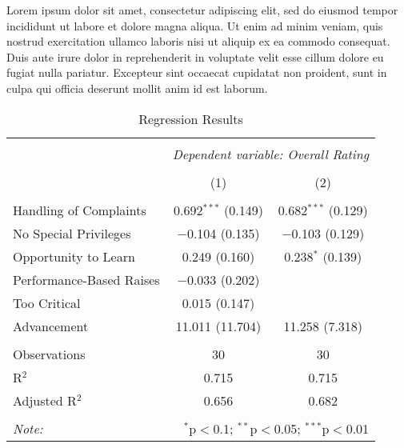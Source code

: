 \documentclass[11pt]{article}
\begin{document}
Lorem ipsum dolor sit amet, consectetur adipiscing elit, sed do eiusmod tempor incididunt ut labore et dolore magna aliqua. Ut enim ad minim veniam, quis nostrud exercitation ullamco laboris nisi ut aliquip ex ea commodo consequat. Duis aute irure dolor in reprehenderit in voluptate velit esse cillum dolore eu fugiat nulla pariatur. Excepteur sint occaecat cupidatat non proident, sunt in culpa qui officia deserunt mollit anim id est laborum. 



\begin{table}[tb] \centering 
    \caption{Regression Results} 
    \label{reg1}
    
    \begin{tabular}{@{\extracolsep{5pt}}lcc} 
    \hline 
    \hline \\[-1.8ex] 
    & \multicolumn{2}{c}{\textit{Dependent variable: Overall Rating}} \\ 
    \cline{2-3} 
    \\[-1.8ex] & (1) & (2)\\ 
    \hline \\[-1.8ex] 
    Handling of Complaints & 0.692$^{***}$ (0.149) & 0.682$^{***}$ (0.129) \\ 
    No Special Privileges & $-$0.104 (0.135) & $-$0.103 (0.129) \\ 
    Opportunity to Learn & 0.249 (0.160) & 0.238$^{*}$ (0.139) \\ 
    Performance-Based Raises & $-$0.033 (0.202) &  \\ 
    Too Critical & 0.015 (0.147) &  \\ 
    Advancement & 11.011 (11.704) & 11.258 (7.318) \\ 
    \hline \\[-1.8ex] 
    Observations & 30 & 30 \\ 
    R$^{2}$ & 0.715 & 0.715 \\ 
    Adjusted R$^{2}$ & 0.656 & 0.682 \\ 
    \hline 
    \hline \\[-1.8ex] 
    \textit{Note:}  & \multicolumn{2}{r}{$^{*}$p$<$0.1; $^{**}$p$<$0.05; $^{***}$p$<$0.01} \\ 
    \end{tabular} 
\end{table}


\newpage~\newpage
\printbibliography
\end{document}
